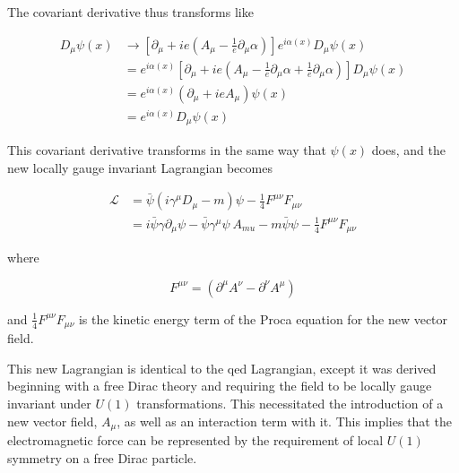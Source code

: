 \noindent The covariant derivative thus transforms like

\begin{equation}\label{eq:u1_covariant_derivative_transformation}
\begin{aligned}
D_{\mu}\psi(x) & \rightarrow [ \partial_{\mu} + ie(A_{\mu} -
\frac{1}{e}\partial_{\mu}\alpha) ]e^{i\alpha(x)}D_{\mu}\psi(x) \\
& = e^{i\alpha(x)}[ \partial_{\mu} + ie(A_{\mu} -
\frac{1}{e}\partial_{\mu}\alpha + \frac{1}{e}\partial_{\mu}\alpha) ]D_{\mu}\psi(x) \\
 & = e^{i\alpha(x)}(\partial_{\mu} + ieA_{\mu})\psi(x) \\
 & = e^{i\alpha(x)}D_{\mu}\psi(x)
\end{aligned}
\end{equation}

\noindent This covariant derivative transforms in the same way that $\psi(x)$
does, and the new locally gauge invariant Lagrangian becomes

\begin{equation}\label{eq:u1_invariant_lagrangian}
\begin{aligned}
\mathcal{L} & = \bar{\psi}(i\gamma^{\mu}D_{\mu} - m)\psi - \frac{1}{4}F^{\mu\nu}F_{\mu\nu} \\
& = i\bar{\psi}\gamma\partial_{\mu}\psi -
\bar{\psi}\gamma^{\mu}\psi~A_{mu} - m\bar{\psi}\psi -
\frac{1}{4}F^{\mu\nu}F_{\mu\nu} 
\end{aligned}
\end{equation}

\noindent where

\begin{equation}\label{eq:u1_field_strength_tensor}
F^{\mu\nu} = (\partial^{\mu}A^{\nu} - \partial^{\nu}A^{\mu})
\end{equation}

\noindent and $\frac{1}{4}F^{\mu\nu}F_{\mu\nu} $ is the kinetic energy
term of the Proca equation for the new vector field.

\par This new Lagrangian is identical to the \acrshort{qed}
Lagrangian, except it was derived beginning with a free Dirac theory
and requiring the field to be locally gauge invariant under $U(1)$
transformations.  This necessitated the introduction of a new vector
field, $A_{\mu}$, as well as an interaction term with it.  This
implies that the electromagnetic force can be represented by the
requirement of local $U(1)$ symmetry on a free Dirac particle.  

